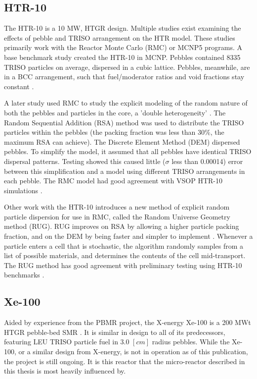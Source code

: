 \subsection{HTR-10}

The HTR-10 is a 10 MW, HTGR design.  Multiple studies exist examining the effects of pebble and TRISO arrangement on the HTR model.  These studies primarily work with the Reactor Monte Carlo (RMC) or MCNP5 programs.  A base benchmark study created the HTR-10 in MCNP.  Pebbles contained 8335 TRISO particles on average, dispersed in a cubic lattice.  Pebbles, meanwhile, are in a BCC arrangement, such that fuel/moderator ratios and void fractions stay constant \cite{kim_monte_2005}.

A later study used RMC to study the explicit modeling of the random nature of both the pebbles and particles in the core, a 'double heterogeneity' \cite{ she_explicit_nodate}.  The Random Sequential Addition (RSA) method was used to distribute the TRISO particles within the pebbles (the packing fraction was less than 30\%, the maximum RSA can achieve).  The Discrete Element Method (DEM) dispersed pebbles.  To simplify the model, it assumed that all pebbles have identical TRISO dispersal patterns.  Testing showed this caused little ($\sigma$ less than 0.00014) error between this simplification and a model using different TRISO arrangements in each pebble.  The RMC model had good agreement with VSOP HTR-10 simulations \cite{ she_explicit_nodate}.

Other work with the HTR-10 introduces a new method of explicit random particle dispersion for use in RMC, called the Random Universe Geometry method (RUG).  RUG improves on RSA by allowing a higher particle packing fraction, and on the DEM by being faster and simpler to implement \cite{liu_random_2018}.  Whenever a particle enters a cell that is stochastic, the algorithm randomly samples from a list of possible materials, and determines the contents of the cell mid-transport.  The RUG method has good agreement with preliminary testing using HTR-10 benchmarks \cite{liu_random_2018}.

\subsection{Xe-100}
\label{sec:xe-100}

Aided by experience from the PBMR project, the X-energy Xe-100 is a 200 MWt HTGR pebble-bed SMR \cite{harlan_x-energy_2018, harlan_ans_2017}.  It is similar in design to all of its predecessors, featuring LEU TRISO particle fuel in 3.0 $\left[cm\right]$ radius pebbles.  While the Xe-100, or a similar design from X-energy, is not in operation as of this publication, the project is still ongoing.  It is this reactor that the micro-reactor described in this thesis is most heavily influenced by.

